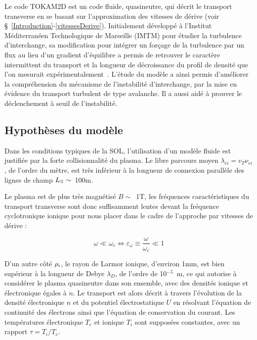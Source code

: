 \begin{refsection}
Le code TOKAM2D est un code fluide, quasineutre, qui décrit le transport
transverse en se basant sur l'approximation des vitesses de dérive (voir
\S~\ref{Introduction}-\ref{vitessesDerive}). Initialement développé à
l'Institut Méditerranéen Technologique de Marseille (IMTM) pour étudier la
turbulence d'interchange, sa modification pour intégrer un forçage de la
turbulence par un flux au lieu d'un gradient d'équilibre a permis de retrouver
le caractère intermittent du transport et la longueur de décroissance du profil
de densité que l'on mesurait expérimentalement~\cite{SarazinPhD}. L'étude du
modèle a ainsi permis d'améliorer la compréhension du mécanisme de
l'instabilité d'interchange, par la mise en évidence du transport turbulent de
type avalanche. Il a aussi aidé à prouver le déclenchement à seuil de l'instabilité.

\subsection{Hypothèses du modèle}
Dans les conditions typiques de la SOL, l'utilisation d'un modèle fluide est
justifiée par la forte collisionnalité du plasma. Le libre parcours moyen
$\lambda_{ei}=v_T \nu_{ei}$, de l'ordre du mètre, est très inférieur à la
longueur de connexion parallèle des lignes de champ $L_\para\sim
$~100m.

Le plasma est de plus très magnétisé $B\sim$~1T, les fréquences
caractéristiques du transport transverse sont donc suffisamment lentes devant la
fréquence cyclotronique ionique pour nous placer dans le cadre de
l'approche par vitesses de dérive :

\begin{equation}
\omega\ll\omega_c\Leftrightarrow \varepsilon_\omega\equiv\frac{\omega}{\omega_c}\ll 1
\end{equation}

D'un autre côté $\rho{_{i}}$, le rayon de Larmor ionique, d'environ
1mm, est bien supérieur à la longueur de
Debye $\lambda_D$, de l'ordre de 10$^{-5}$~m, ce qui autorise à
considérer le plasma quasineutre dans son ensemble, avec des densités ionique
et électronique égales à $n$.
Le transport est alors décrit à travers l'évolution de la densité
électronique $n$ et du potentiel électrostatique $U$ en résolvant l'équation
de continuité des électrons ainsi que l'équation de conservation du courant. Les
températures électronique
$T_e$ et ionique $T_i$ sont supposées constantes, avec un rapport $\tau=T_i/T_e$.


\end{refsection}
